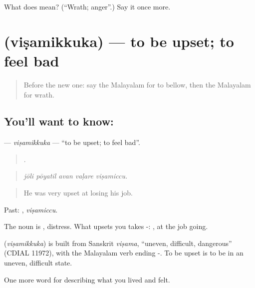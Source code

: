 \begin{tcolorbox}[breakable,colback=teal!4,colframe=teal!35!black,title={Before you move on}]
What does  mean? (\textquotedblleft{}Wrath; anger\textquotedblright{}.) Say it once more.
\end{tcolorbox}
\section[\texorpdfstring{\ml{വിഷമിക്കുക} (viṣamikkuka)}{വിഷമിക്കുക (viṣamikkuka)}]{ (viṣamikkuka) — to be upset; to feel bad}

\label{lesson:ML-C517-visamikkuka}



\begin{quote}
Before the new one: say the Malayalam for to bellow, then the Malayalam for wrath.
\end{quote}

\subsection*{You'll want to know: }
\textbf{} — \emph{viṣamikkuka} — \textquotedblleft{}to be upset; to feel bad\textquotedblright{}.

\begin{quote}
    .
\end{quote}

\begin{quote}
\emph{jōli pōyatil avan vaḷare viṣamiccu.}
\end{quote}

\begin{quote}
He was very upset at losing his job.
\end{quote}

Past: , \emph{viṣamiccu}.

The noun is , distress. What upsets you takes -:  , at the job going.

\begin{cousinweb}
\textbf{} (\emph{viṣamikkuka}) is built from Sanskrit \emph{viṣama}, \textquotedblleft{}uneven, difficult, dangerous\textquotedblright{} (CDIAL 11972), with the Malayalam verb ending -. To be upset is to be in an uneven, difficult state.
\end{cousinweb}

\begin{grammarlens}[title={What you've built}]
One more word for describing what you lived and felt.
\end{grammarlens}

